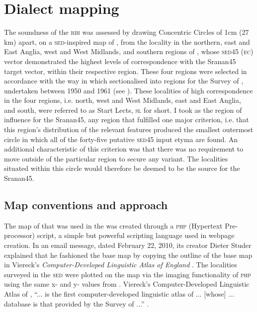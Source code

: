 \section{Dialect mapping}\label{5.4}
The soundness of the \textsc{rih} was assessed by drawing Concentric Circles of 1cm (27 km) apart, on a \textsc{\textsc{sed}}-inspired map of , from the locality in the northern, east and East Anglia, west and West Midlands, and southern regions of , whose \textsc{sed45} (\textsc{ec}) vector demonstrated the highest levels of correspondence with the Sranan45 target vector, within their respective region. These four regions were selected in accordance with the way in which \citet{Orton6271} sectionalised  into regions for the Survey of  , undertaken between 1950 and 1961 (see ). These localities of high correspondence in the four regions, i.e. north, west and West Midlands, east and East Anglia, and south, were referred to as Start Lects, \textsc{sl} for short. I took as the region of influence for the Sranan45, any region that fulfilled one major criterion, i.e. that this region's distribution of the relevant features produced the smallest outermost circle in which all of the forty-five putative \textsc{sed45} input etyma are found. An additional characteristic of this criterion was that there was no requirement to move outside of the particular region to secure any variant. The localities situated within this circle would therefore be deemed to be the  source for the Sranan45.

\subsection{Map conventions and approach}\label{5.4.1}
The map of  that was used in the  was created through a \textsc{php} (Hypertext Pre-processor) script, a simple but powerful scripting language used in webpage creation. In an email message, dated February 22, 2010, its creator Dieter Studer explained that he fashioned the base map by copying the outline of the base map in Viereck's  \emph{Computer-Developed Linguistic Atlas of England} \citep{Viereck90}. The localities surveyed in the \textsc{\textsc{sed}} were plotted on the map via the imaging functionality of \textsc{php} using the same x- and y- values from \citet{Viereck90}. Viereck's Computer-Developed Linguistic Atlas of , ``... is the first computer-developed linguistic atlas of ... [whose] ... database is that provided by the Survey of   ...'' \citep[79]{Viereck97}.

